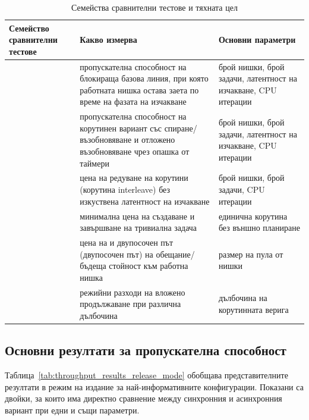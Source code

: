 \begin{table}[H]
\centering
\small
\caption{Семейства сравнителни тестове и тяхната цел}
\label{tab:benchmark_families}
\begin{tabularx}{\textwidth}{L{3.4cm}L{5.2cm}Y}
\toprule
\textbf{Семейство сравнителни тестове} & \textbf{Какво измерва} & \textbf{Основни параметри} \\
\midrule
{} & пропускателна способност на блокираща базова линия, при която работната нишка остава заета по време на фазата на изчакване & брой нишки, брой задачи, латентност на изчакване, CPU итерации \\
 & пропускателна способност на корутинен вариант със спиране/възобновяване и отложено възобновяване чрез опашка от таймери & брой нишки, брой задачи, латентност на изчакване, CPU итерации \\
 & цена на редуване на корутини (корутина interleave) без изкуствена латентност на изчакване & брой нишки, брой задачи, CPU итерации \\
 & минимална цена на създаване и завършване на тривиална задача & единична корутина без външно планиране \\
 & цена на  и двупосочен път (двупосочен път) на обещание/бъдеща стойност към работна нишка & размер на пула от нишки \\
 & режийни разходи на вложено  продължаване при различна дълбочина & дълбочина на корутинната верига \\
\bottomrule
\end{tabularx}
\end{table}

\subsection{Основни резултати за пропускателна способност}

Таблица~\ref{tab:throughput_results_release_mode} обобщава представителните резултати в режим на издание за най-информативните конфигурации. Показани са двойки, за които има директно сравнение между синхронния и асинхронния вариант при едни и същи параметри.

